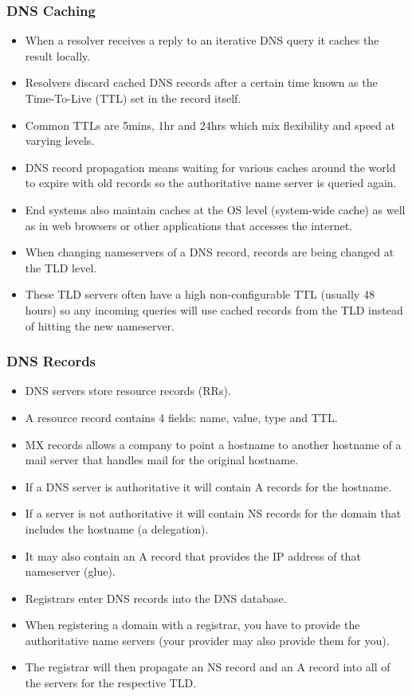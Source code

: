 \documentclass{article}
\begin{document}
\subsubsection{DNS Caching}
\begin{itemize}
    \item When a resolver receives a reply to an iterative DNS query it caches the result locally.
    \item Resolvers discard cached DNS records after a certain time known as the Time-To-Live (TTL) set in the record itself.
    \item Common TTLs are 5mins, 1hr and 24hrs which mix flexibility and speed at varying levels.
    \item DNS record propagation means waiting for various caches around the world to expire with old records so the authoritative name server is queried again.
    \item End systems also maintain caches at the OS level (system-wide cache) as well as in web browsers or other applications that accesses the internet.
    \item When changing nameservers of a DNS record, records are being changed at the TLD level.
    \item These TLD servers often have a high non-configurable TTL (usually 48 hours) so any incoming queries will use cached records from the TLD instead of hitting the new nameserver.
\end{itemize}

\subsubsection{DNS Records}

\begin{itemize}
    \item DNS servers store resource records (RRs).
    \item A resource record contains 4 fields: name, value, type and TTL.
    \item MX records allows a company to point a hostname to another hostname of a mail server that handles mail for the original hostname.
    \item If a DNS server is authoritative it will contain A records for the hostname.
    \item If a server is not authoritative it will contain NS records for the domain that includes the hostname (a delegation).
    \item It may also contain an A record that provides the IP address of that nameserver (glue).
    \item Registrars enter DNS records into the DNS database.
    \item When registering a domain with a registrar, you have to provide the authoritative name servers (your provider may also provide them for you).
    \item The registrar will then propagate an NS record and an A record into all of the servers for the respective TLD.
\end{itemize}
\end{document}
